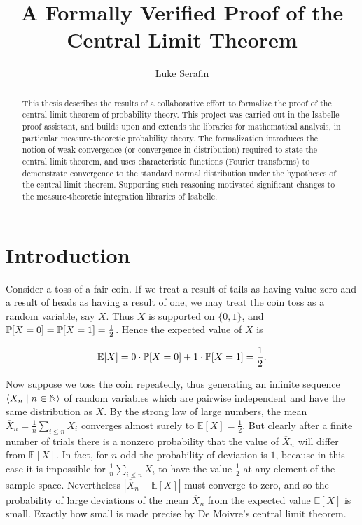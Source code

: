 \documentclass{article}
\title{A Formally Verified Proof of the \protect\\ Central Limit Theorem}
\author{Luke Serafin}
\theoremstyle{definition}
\newcommand{\bldseq}[2]{\langle{#1}\mid{#2}\rangle}
\renewcommand{\E}{\mathbb E}
\begin{document}
\maketitle

\begin{abstract}
This thesis describes the results of a collaborative effort to formalize the proof of the central limit theorem of probability theory. This project was carried out in the Isabelle proof assistant, and builds upon and extends the libraries for mathematical analysis, in particular measure-theoretic probability theory. The formalization introduces the notion of weak convergence (or convergence in distribution) required to state the central limit theorem, and uses characteristic functions (Fourier transforms) to demonstrate convergence to the standard normal distribution under the hypotheses of the central limit theorem. Supporting such reasoning motivated significant changes to the measure-theoretic integration libraries of Isabelle.
\end{abstract}

\tableofcontents

\newpage

\section{Introduction}

Consider a toss of a fair coin. If we treat a result of tails as having value zero and a result of heads as having a result of one, we may treat the coin toss as a random variable, say $X$. Thus $X$ is supported on $\{0,1\}$, and $\P[X = 0] = \P[X = 1] = \frac{1}{2}$. Hence the expected value of $X$ is

\[ \E[X] = 0 \cdot \P[X = 0] + 1 \cdot \P[X = 1] = \frac{1}{2}. \]

Now suppose we toss the coin repeatedly, thus generating an infinite sequence $\bldseq{X_n}{n \in \N}$ of random variables which are pairwise independent and have the same distribution as $X$. By the strong law of large numbers, the mean $\overline X_n = \frac{1}{n} \sum_{i \le n} X_i$ converges almost surely to $\E[X] = \frac{1}{2}$. But clearly after a finite number of trials there is a nonzero probability that the value of $\overline X_n$ will differ from $\E[X]$. In fact, for $n$ odd the probability of deviation is $1$, because in this case it is impossible for $\frac{1}{n} \sum_{i \le n} X_i$ to have the value $\frac{1}{2}$ at any element of the sample space. Nevertheless $|\overline X_n - \E[X]|$ must converge to zero, and so the probability of large deviations of the mean $\overline X_n$ from the expected value $\E[X]$ is small. Exactly how small is made precise by De Moivre's central limit theorem.
\end{document}
